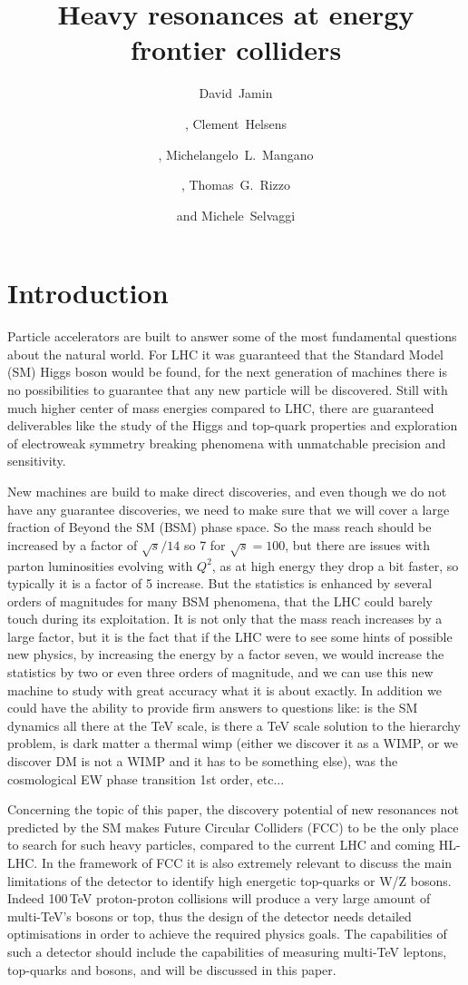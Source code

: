 \documentclass[a4paper,11pt]{article}
\title{\boldmath Heavy resonances at energy frontier colliders}
\author[a,c]{David~Jamin}
\author[a]{\!\!, Clement~Helsens}
\author[a]{\!\!, Michelangelo~L.~Mangano}
\author[b]{\!\!, Thomas~G.~Rizzo}
\author[a]{and Michele~Selvaggi}
\affiliation[a]{CERN, CH-1211 Geneva 23, Switzerland}
\affiliation[b]{SLAC National Accelerator Laboratory 2575 Sand Hill Rd., Menlo Park, CA, 94025 USA}
\affiliation[c]{Academia Sinica, Institute of  Physics, Taipei, Taiwan}
\begin{document}
\maketitle
\flushbottom

\section{Introduction}
\label{sec:intro}

Particle accelerators are built to answer some of the most fundamental questions about the natural world. For LHC it was guaranteed that the Standard Model (SM) Higgs boson would be found, for the next generation of machines there is no possibilities to guarantee that any new particle will be discovered. Still with much higher center of mass energies compared to LHC, there are guaranteed deliverables like the study of the Higgs and top-quark properties and exploration of electroweak symmetry breaking phenomena with unmatchable precision and sensitivity.

New machines are build to make direct discoveries, and even though we do not have any guarantee discoveries, we need to make sure that we will cover a large fraction of Beyond the SM (BSM) phase space. So the mass reach should be increased by a factor of $\sqrt{s}/14$ so 7 for $\sqrt{s}=100$, but there are issues with parton luminosities evolving with $Q^2$, as at high energy they drop a bit faster, so typically it is a factor of 5 increase. But the statistics is enhanced by several orders of magnitudes for many BSM phenomena, that the LHC could barely touch during its exploitation. It is not only that the mass reach increases by a large factor, but it is the fact that if the LHC were to see some hints of possible new physics, by increasing the energy by a factor seven, we would increase the statistics by two or even three orders of magnitude, and we can use this new machine to study with great accuracy what it is about exactly.
In addition we could have the ability to provide firm answers to questions like: is the SM dynamics all there at the TeV scale, is there a TeV scale solution to the hierarchy problem, is dark matter a thermal wimp (either we discover it as a WIMP, or we discover DM is not a WIMP and it has to be something else), was the cosmological EW phase transition 1st order, etc...

Concerning the topic of this paper, the discovery potential of new resonances not predicted by the SM makes Future Circular Colliders (FCC) to be the only  place to search for such heavy particles, compared to the current LHC and coming HL-LHC.
In the framework of FCC it is also extremely relevant to discuss the main limitations of the detector to identify high energetic top-quarks or W/Z bosons. Indeed 100\,TeV proton-proton collisions will produce a very large amount of multi-TeV's bosons or top, thus the design of the detector needs detailed optimisations in order to achieve the required physics goals. The capabilities of such a detector should include the capabilities of measuring multi-TeV leptons, top-quarks and bosons, and will be discussed in this paper.
\end{document}
